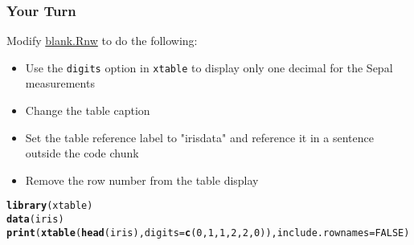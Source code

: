 \documentclass{beamer}\usepackage[]{graphicx}\usepackage[]{color}
\makeatletter
\newcommand{\hlnum}[1]{\textcolor[rgb]{0.686,0.059,0.569}{#1}}%
\newcommand{\hlstd}[1]{\textcolor[rgb]{0.345,0.345,0.345}{#1}}%
\newcommand{\hlkwc}[1]{\textcolor[rgb]{0.333,0.667,0.333}{#1}}%
\newcommand{\hlkwd}[1]{\textcolor[rgb]{0.737,0.353,0.396}{\textbf{#1}}}%
\newenvironment{kframe}{%
 \def\at@end@of@kframe{}%
 \ifinner\ifhmode%
  \def\at@end@of@kframe{\end{minipage}}%
  \begin{minipage}{\columnwidth}%
 \fi\fi%
 \def\FrameCommand##1{\hskip\@totalleftmargin \hskip-\fboxsep
 \colorbox{shadecolor}{##1}\hskip-\fboxsep
     \hskip-\linewidth \hskip-\@totalleftmargin \hskip\columnwidth}%
 \MakeFramed {\advance\hsize-\width
   \@totalleftmargin\z@ \linewidth\hsize
   \@setminipage}}%
 {\par\unskip\endMakeFramed%
 \at@end@of@kframe}
\newenvironment{knitrout}{}{} %
\makeatother
\begin{document}
\begin{frame}[fragile]
\frametitle{Your Turn}
Modify \href{../code/02-blank.Rnw}{blank.Rnw} to do the following:
\begin{itemize}
\item Use the \texttt{digits} option in \texttt{xtable} to display only one decimal for the Sepal measurements
\item Change the table caption
\item Set the table reference label to "irisdata" and reference it in a sentence outside the code chunk
\item Remove the row number from the table display
\end{itemize}

\begin{knitrout}\footnotesize
{}\color{fgcolor}\begin{kframe}
\begin{alltt}
\hlkwd{library}\hlstd{(xtable)}
\hlkwd{data}\hlstd{(iris)}
\hlkwd{print}\hlstd{(}\hlkwd{xtable}\hlstd{(}\hlkwd{head}\hlstd{(iris),} \hlkwc{digits}\hlstd{=}\hlkwd{c}\hlstd{(}\hlnum{0}\hlstd{,} \hlnum{1}\hlstd{,} \hlnum{1}\hlstd{,} \hlnum{2}\hlstd{,} \hlnum{2}\hlstd{,} \hlnum{0}\hlstd{)),} \hlkwc{include.rownames}\hlstd{=}\hlnum{FALSE}\hlstd{)}
\end{alltt}
\end{kframe}
\end{knitrout}

\end{frame}

\end{document}
